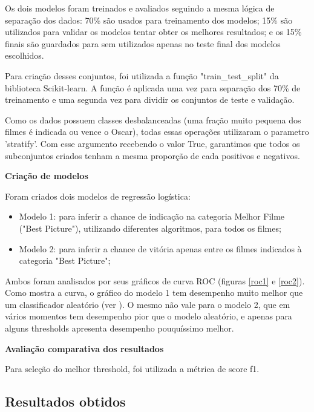         Os dois modelos foram treinados e avaliados seguindo a mesma lógica de separação dos dados: 70\% são usados para treinamento dos modelos; 15\% são utilizados para validar os modelos tentar obter os melhores resultados; e os 15\% finais são guardados para sem utilizados apenas no teste final dos modelos escolhidos.
        
        Para criação desses conjuntos, foi utilizada a função "train\_test\_split" da biblioteca Scikit-learn. A função é aplicada uma vez para separação dos 70\% de treinamento e uma segunda vez para dividir os conjuntos de teste e validação.\newline
        
        Como os dados possuem classes desbalanceadas (uma fração muito pequena dos filmes é indicada ou vence o Oscar), todas essas operações utilizaram o parametro 'stratify'. Com esse argumento recebendo o valor True, garantimos que todos os subconjuntos criados tenham a mesma proporção de cada positivos e negativos.

        \textbf{Criação de modelos}\par
        Foram criados dois modelos de regressão logística:
        
        \begin{itemize}
            \item Modelo 1: para inferir a chance de indicação na categoria Melhor Filme ("Best Picture"), utilizando diferentes algoritmos, para todos os filmes;
            \item Modelo 2: para inferir a chance de vitória apenas entre os filmes indicados à categoria "Best Picture";
        \end{itemize}
        
        Ambos foram analisados por seus gráficos de curva ROC (figuras \ref{roc1} e \ref{roc2}). Como mostra a curva, o gráfico  do modelo 1 tem desempenho muito melhor que um classificador aleatório (ver ). O mesmo não vale para o modelo 2, que em vários momentos tem desempenho pior que o modelo aleatório, e apenas para alguns thresholds apresenta desempenho pouquíssimo melhor.

        \textbf{Avaliação comparativa dos resultados}\par
        Para seleção do melhor threshold, foi utilizada a métrica de score f1.
        
    \subsection{Resultados obtidos}
        

